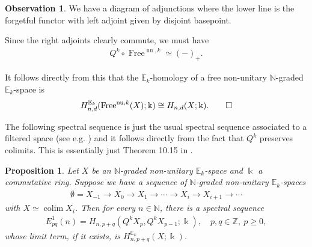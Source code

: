 \documentclass[12pt, reqno]{amsart}
\theoremstyle{plain}
\newtheorem{proposition}[theorem]{Proposition}
\theoremstyle{definition}
\newtheorem{observation}[theorem]{Observation}
\newcommand{\N}{\mathbb N}
\newcommand{\Z}{\mathbb Z}
\begin{document}
\begin{observation}\label{Indecomposables of free things}
We have a diagram of adjunctions where the lower line is the forgetful functor with left adjoint given by disjoint basepoint.
\begin{center}
\end{center}

Since the right adjoints clearly commute, we must have
\begin{align*}
Q^k\circ \operatorname{Free}^{\operatorname{nu},k}\simeq (-)_+.
\end{align*}

It follows directly from this that the $\mathbb{E}_k$-homology of a free non-unitary $\N$-graded $\mathbb{E}_k$-space is
\begin{equation*}
H^{\mathbb{E}_k}_{n,d}(\operatorname{Free}^{\operatorname{nu},k}(X);\Bbbk)\cong H_{n,d}(X; \Bbbk).\qedhere
\end{equation*}
\end{observation}

The following spectral sequence is just the usual spectral sequence associated to a filtered space (see e.g. \cite{HatcherSS}) and it follows directly from the fact that $Q^k$ preserves colimits. This is essentially just Theorem 10.15 in \cite{GalatiusKupersRandalWilliams}.

\begin{proposition}\label{general spectral sequence}
Let $X$ be an $\N$-graded non-unitary $\mathbb{E}_k$-space and $\Bbbk$ a commutative ring. Suppose we have a sequence of $\N$-graded non-unitary $\mathbb{E}_k$-spaces
\begin{align*}
\emptyset=X_{-1}\rightarrow X_0\rightarrow X_1 \rightarrow \cdots \rightarrow X_i\rightarrow X_{i+1}\rightarrow \cdots
\end{align*}
with $X\simeq \operatorname{colim} X_i$. Then for every $n\in \N$, there is a spectral sequence
\begin{align*}
E^1_{pq}(n)=H_{n,p+q}(Q^kX_p,Q^kX_{p-1};\Bbbk), \quad p,q\in \Z,\ p\geq 0,
\end{align*}
whose limit term, if it exists, is $H_{n,p+q}^{\mathbb{E}_k}(X;\Bbbk)$.
\end{proposition}
\end{document}
